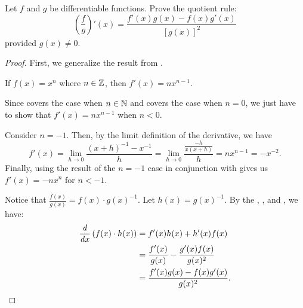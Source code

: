\begin{problem}
  Let $f$ and $g$ be differentiable functions. Prove the quotient rule:
    \begin{equation*}
      \left(\frac{f}{g}\right)' (x) = \frac{f'(x)g(x) - f(x)g'(x)}{[g(x)]^2}
    \end{equation*}
  provided $g(x) \neq 0$.

  \begin{proof}
    First, we generalize the result from .
    \begin{theorem}
      \label{thm:derivative-power-rule-integers}
      If $f(x) = x^{n}$ where $n \in \mathbb{Z}$, then $f'(x) = nx^{n-1}$.
    \end{theorem}

    \begin{subproof}
      Since  covers the case when $n \in \mathbb{N}$
      and  covers the case when $n = 0$, we just have to show that
      $f'(x) = nx^{n-1}$ when $n < 0$.

      Consider $n = -1$. Then, by the limit definition of the derivative, we have
      \[
        f'(x) = \lim_{h \to 0} \frac{(x + h)^{-1} - x^{-1}}{h} = \lim_{h \to 0} \frac{\frac{-h}{x(x + h)}}{h} = nx^{n-1} = -x^{-2}.
      \]
      Finally, using the result of the $n = -1$ case in conjunction with  gives us
      $f'(x) = -nx^{n}$ for $n < -1$.
    \end{subproof}

    Notice that $\frac{f(x)}{g(x)} = f(x) \cdot g(x)^{-1}$.
    Let $h(x) = g(x)^{-1}$. By the , , and
    , we have:
    \begin{align*}
        \dfrac{\mathit{d} }{\mathit{d} x} \left( f(x) \cdot {h(x)} \right) &= f'(x)h(x) + h'(x)f(x)\\
                                                    &= \frac{f'(x)}{g(x)} -\frac{g'(x) f(x)}{g(x)^{2}}\\
                                                    &= \frac{f'(x) g(x) - f(x) g'(x)} {g(x)^2}.
    \end{align*}
  \end{proof}

\end{problem}


